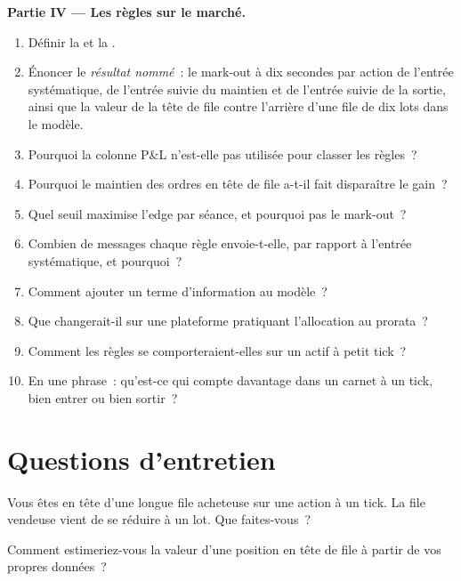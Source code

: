 \begin{problem}
\medskip\noindent\textbf{Partie IV --- Les règles sur le marché.}
\begin{enumerate}[resume]
\item Définir la  et la .
\item Énoncer le \emph{résultat nommé}~: le mark-out à dix secondes par action de l'entrée systématique, de l'entrée suivie du maintien et de l'entrée suivie de la sortie, ainsi que la
valeur de la tête de file contre l'arrière d'une file de dix lots dans le modèle.
\item Pourquoi la colonne P\&L n'est-elle pas utilisée pour classer les règles~?
\item Pourquoi le maintien des ordres en tête de file a-t-il fait disparaître le gain~?
\item Quel seuil maximise l'edge par séance, et pourquoi pas le mark-out~?
\item Combien de messages chaque règle envoie-t-elle, par rapport à l'entrée systématique, et pourquoi~?
\item Comment ajouter un terme d'information au modèle~?
\item Que changerait-il sur une plateforme pratiquant l'allocation au prorata~?
\item Comment les règles se comporteraient-elles sur un actif à petit tick~?
\item En une phrase~: qu'est-ce qui compte davantage dans un carnet à un tick, bien entrer ou bien sortir~?
\end{enumerate}
\end{problem}

\section{Questions d'entretien}

\begin{interviewq}\label{iq:hf:queue-reactive-models-and-large-tick-assets:1}
Vous êtes en tête d'une longue file acheteuse sur une action à un tick. La file vendeuse vient de se réduire à un lot. Que faites-vous~?
\end{interviewq}

\begin{interviewq}\label{iq:hf:queue-reactive-models-and-large-tick-assets:2}
Comment estimeriez-vous la valeur d'une position en tête de file à partir de vos propres données~?
\end{interviewq}

